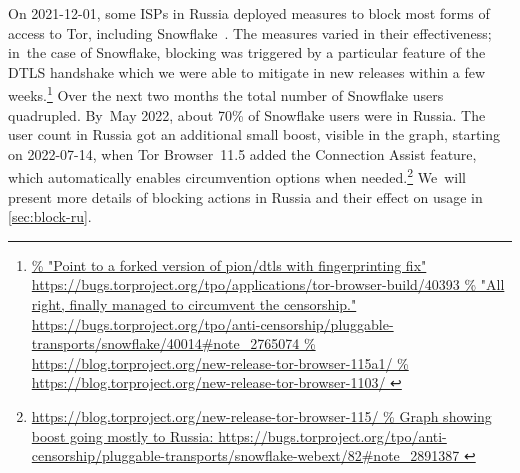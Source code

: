 \documentclass[letterpaper,twocolumn]{article}
\newlength{\urlfootnotesize}
\newcommand{\urlfootnote}[1]{\footnote{
\raggedright\fontsize{\urlfootnotesize}{\urlfootnotesize}\selectfont\url{#1}
}}
\begin{document}
On \mbox{2021-12-01}, some ISPs in Russia
deployed measures to block
most forms of access to Tor,
including Snowflake~\cite{ooni-2021-russia-blocks-tor}.
The measures varied in their effectiveness;
in~the case of Snowflake,
blocking was triggered by a particular feature of the DTLS handshake
which we were able to mitigate in new releases within a few weeks.\urlfootnote{
https://bugs.torproject.org/tpo/applications/tor-browser-build/40393
}
Over the next two months the total number of Snowflake users quadrupled.
By~May 2022,
about 70\% of Snowflake users were in Russia.
The user count in Russia got an additional small boost,
visible in the graph,
starting on \mbox{2022-07-14},
when Tor Browser~11.5 added the Connection Assist feature,
which automatically enables circumvention options when needed.\urlfootnote{
https://blog.torproject.org/new-release-tor-browser-115/
}
We~will present more details of blocking actions in Russia
and their effect on usage in \autoref{sec:block-ru}.
\end{document}
